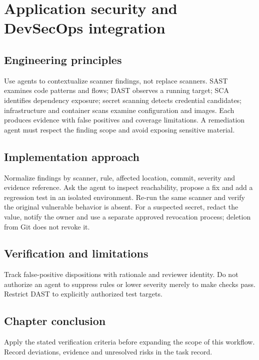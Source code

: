 \chapter{Application security and DevSecOps integration}

\section{Engineering principles}

Use agents to contextualize scanner findings, not replace scanners. SAST examines code patterns and flows; DAST observes a running target; SCA identifies dependency exposure; secret scanning detects credential candidates; infrastructure and container scans examine configuration and images. Each produces evidence with false positives and coverage limitations. A remediation agent must respect the finding scope and avoid exposing sensitive material.

\section{Implementation approach}

Normalize findings by scanner, rule, affected location, commit, severity and evidence reference. Ask the agent to inspect reachability, propose a fix and add a regression test in an isolated environment. Re-run the same scanner and verify the original vulnerable behavior is absent. For a suspected secret, redact the value, notify the owner and use a separate approved revocation process; deletion from Git does not revoke it.

\section{Verification and limitations}

Track false-positive dispositions with rationale and reviewer identity. Do not authorize an agent to suppress rules or lower severity merely to make checks pass. Restrict DAST to explicitly authorized test targets.

\section{Chapter conclusion}

Apply the stated verification criteria before expanding the scope of this workflow. Record deviations, evidence and unresolved risks in the task record.
